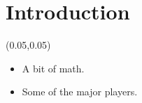 \documentclass[aspectratio=169]{beamer} %
\begin{document}
\section{Introduction}

\begin{frame}{}
    \setlength{\TPHorizModule}{\textwidth}
    \setlength{\TPVertModule}{\textwidth}
    \begin{textblock}{0.74}(0.05,0.05)
        \bfseries\large{}
    \end{textblock}
    \begin{itemize}
        \item A bit of math.
        \item Some of the major players.
    \end{itemize}
\end{frame}
\end{document}
